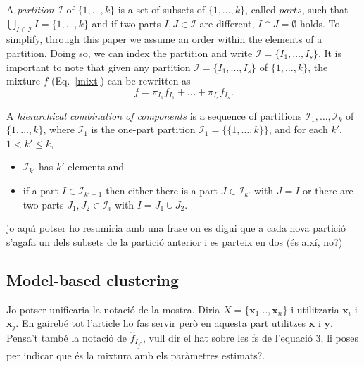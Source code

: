 \documentclass[10pt, a4paper]{article}
\newcommand{\m}[1]{\boldsymbol{#1}}
\begin{document}
A \emph{partition} $\mathcal{I}$ of $\{1, \dots, k\}$ is a set of subsets of $\{1, \dots, k\}$, called $parts$, such that $\bigcup_{I \in \mathcal{I}} I = \{1, \dots, k\}$ and  if two parts $I, J \in \mathcal{I}$ are different, $I \cap J = \emptyset$ holds. To simplify, through this paper we assume an order within the elements of a partition. Doing so, we can index the partition and write $\mathcal{I} = \{ I_1, \dots, I_s\}$. It is important to note that given any partition $\mathcal{I} = \{ I_1, \dots, I_s\}$ of $\{1, \dots, k\}$, the mixture $f$ (Eq.~\ref{mixt}) can be rewritten as
\begin{equation}
f = \pi_{I_1} f_{I_1} + \dots + \pi_{I_s} f_{I_s}.
\label{mixt_part}
\end{equation}


A \emph{hierarchical combination of components} is a sequence of partitions $\mathcal{I}_1, \dots, \mathcal{I}_k$ of $\{1,...,k\}$, where $\mathcal{I}_1$ is the one-part partition $\mathcal{I}_1 = \{ \{1, \dots, k\} \}$, and for each $k'$, $1 <  k' \leq k$,
\begin{itemize}
\item $\mathcal{I}_{k'}$ has $k'$ elements  and
\item if a part $I \in \mathcal{I}_{k'-1}$ then either there is a part $J \in \mathcal{I}_{k'}$ with $J = I$ or there are two parts $J_1, J_2 \in \mathcal{I}_i$ with $I = J_1 \cup J_2$.
\end{itemize}

{\color{blue} jo aqu\'{\i} potser ho resumiria amb una frase on es digui que a cada nova partició s'agafa un dels subsets de la partició anterior i es parteix en dos (és així, no?)}

\subsection*{Model-based clustering}
{\color{blue} Jo potser unificaria la notació de la mostra. Diria $X = \{\m x_1\dots, \m x_n\}$ i utilitzaria $\m x_i$ i $\m x_j$. En gaireb\'{e} tot l'article ho fas servir per\`{o} en aquesta part utilitzes $\m x$ i $\m y$. Pensa't tamb\'{e} la notaci\'{o} de $\hat{f}_{I_{j^*}}$, vull dir el hat sobre les fs de l'equaci\'{o} 3, li poses per indicar que \'{e}s la mixtura amb els par\`{a}metres estimats?.}
\end{document}
